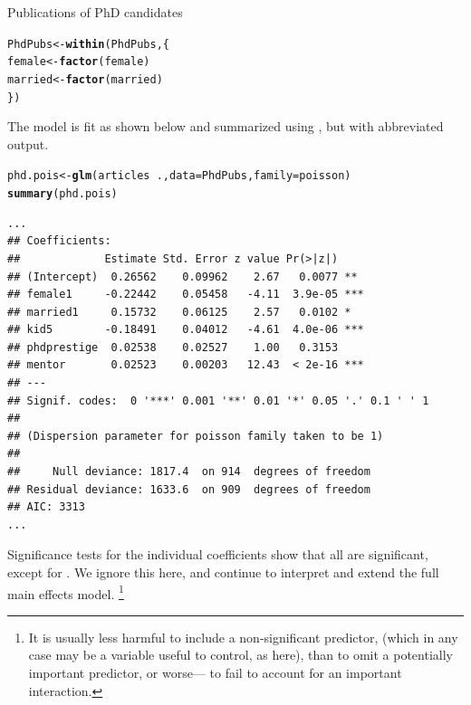 \documentclass[11pt]{book}\usepackage[]{graphicx}\usepackage[]{color}
\makeatletter
\newcommand{\hlopt}[1]{\textcolor[rgb]{0,0,0}{#1}}%
\newcommand{\hlstd}[1]{\textcolor[rgb]{0.345,0.345,0.345}{#1}}%
\newcommand{\hlkwb}[1]{\textcolor[rgb]{0.69,0.353,0.396}{#1}}%
\newcommand{\hlkwc}[1]{\textcolor[rgb]{0.333,0.667,0.333}{#1}}%
\newcommand{\hlkwd}[1]{\textcolor[rgb]{0.737,0.353,0.396}{\textbf{#1}}}%
\newenvironment{kframe}{%
 \def\at@end@of@kframe{}%
 \ifinner\ifhmode%
  \def\at@end@of@kframe{\end{minipage}}%
  \begin{minipage}{\columnwidth}%
 \fi\fi%
 \def\FrameCommand##1{\hskip\@totalleftmargin \hskip-\fboxsep
 \colorbox{shadecolor}{##1}\hskip-\fboxsep
     \hskip-\linewidth \hskip-\@totalleftmargin \hskip\columnwidth}%
 \MakeFramed {\advance\hsize-\width
   \@totalleftmargin\z@ \linewidth\hsize
   \@setminipage}}%
 {\par\unskip\endMakeFramed%
 \at@end@of@kframe}
\newenvironment{knitrout}{}{} %
\renewenvironment{knitrout}{\small\renewcommand{\baselinestretch}{.85}}{} %
\makeatother
\begin{document}
\begin{Example}[phdpubs1]{Publications of PhD candidates}
\begin{knitrout}
\color{fgcolor}\begin{kframe}
\begin{alltt}
\hlstd{PhdPubs} \hlkwb{<-} \hlkwd{within}\hlstd{(PhdPubs, \{}
  \hlstd{female} \hlkwb{<-} \hlkwd{factor}\hlstd{(female)}
  \hlstd{married} \hlkwb{<-} \hlkwd{factor}\hlstd{(married)}
\hlstd{\})}
\end{alltt}
\end{kframe}
\end{knitrout}

The model is fit as shown below and summarized using , but with abbreviated output.
\begin{knitrout}
\color{fgcolor}\begin{kframe}
\begin{alltt}
\hlstd{phd.pois} \hlkwb{<-} \hlkwd{glm}\hlstd{(articles} \hlopt{~} \hlstd{.,} \hlkwc{data}\hlstd{=PhdPubs,} \hlkwc{family}\hlstd{=poisson)}
\hlkwd{summary}\hlstd{(phd.pois)}
\end{alltt}
\begin{verbatim}
...
## Coefficients:
##             Estimate Std. Error z value Pr(>|z|)    
## (Intercept)  0.26562    0.09962    2.67   0.0077 ** 
## female1     -0.22442    0.05458   -4.11  3.9e-05 ***
## married1     0.15732    0.06125    2.57   0.0102 *  
## kid5        -0.18491    0.04012   -4.61  4.0e-06 ***
## phdprestige  0.02538    0.02527    1.00   0.3153    
## mentor       0.02523    0.00203   12.43  < 2e-16 ***
## ---
## Signif. codes:  0 '***' 0.001 '**' 0.01 '*' 0.05 '.' 0.1 ' ' 1
## 
## (Dispersion parameter for poisson family taken to be 1)
## 
##     Null deviance: 1817.4  on 914  degrees of freedom
## Residual deviance: 1633.6  on 909  degrees of freedom
## AIC: 3313
...
\end{verbatim}
\end{kframe}
\end{knitrout}
Significance tests for the individual coefficients show that all are significant,
except for .  We ignore this here, and continue to interpret and
extend the full main effects model.%
\footnote{
It is usually less harmful to include a non-significant predictor,
(which in any case may be a variable useful to control, as  here), than to omit a
potentially important predictor, or worse--- to fail to account for an important interaction.
}


\end{Example}
\end{document}
